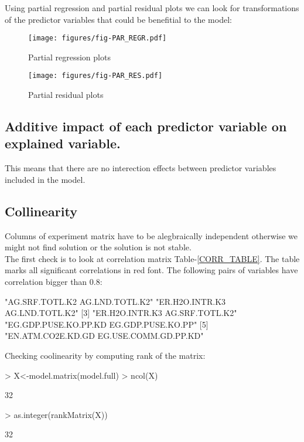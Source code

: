 \documentclass[a4paper]{article}
\begin{document}
Using partial regression and partial residual plots we can look for
transformations of the predictor variables that could be benefitial to the
model: 
\begin{figure}[H]
\begin{center}
\advance\rightskip-0.5cm
\advance\leftskip-1cm
\texttt{[image: figures/fig-PAR\_REGR.pdf]}
\caption{Partial regression plots}
\end{center}
\label{PAR_REGR_PLOT}
\end{figure}

\begin{figure}[H]
\begin{center}
\advance\rightskip-0.5cm
\advance\leftskip-0.8cm
\texttt{[image: figures/fig-PAR\_RES.pdf]}
\caption{Partial residual plots}
\end{center}
\label{PAR_RES_PLOT}
\end{figure}
  
  \subsection{Additive impact of each predictor variable on explained
  variable.}
  This means that there are no interection effects between predictor variables
  included in the model.
  \subsection{Collinearity}
  Columns of experiment matrix have to be
  alegbraically independent otherwise we might not find solution or the
  solution is not stable.\\

The first check is to look at correlation matrix Table-\ref{CORR_TABLE}. The
table marks all significant correlations in red font. The following pairs of
variables have correlation bigger than 0.8:
\begin{Schunk}
\begin{Soutput}
[1] "AG.SRF.TOTL.K2 AG.LND.TOTL.K2"          "ER.H2O.INTR.K3 AG.LND.TOTL.K2"         
[3] "ER.H2O.INTR.K3 AG.SRF.TOTL.K2"          "EG.GDP.PUSE.KO.PP.KD EG.GDP.PUSE.KO.PP"
[5] "EN.ATM.CO2E.KD.GD EG.USE.COMM.GD.PP.KD"
\end{Soutput}
\end{Schunk}

Checking coolinearity by computing
rank of the matrix:
\begin{Schunk}
\begin{Sinput}
> X<-model.matrix(model.full)
> ncol(X)
\end{Sinput}
\begin{Soutput}
[1] 32
\end{Soutput}
\begin{Sinput}
> as.integer(rankMatrix(X))
\end{Sinput}
\begin{Soutput}
[1] 32
\end{Soutput}
\end{Schunk}
\end{document}
